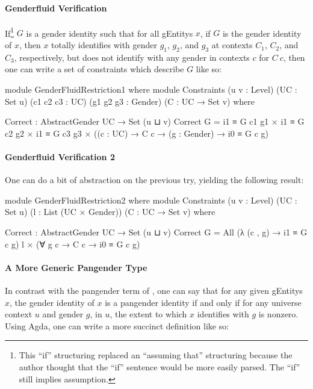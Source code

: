 \documentclass{article}
\theoremstyle{remark}
\begin{document}
\paragraph{Genderfluid Verification}
If\footnote{This ``if'' structuring replaced an ``assuming that'' structuring because the author thought that the ``if'' sentence would be more easily parsed.  The ``if'' still implies assumption.} \(G\) is a gender identity such that for all \glspl{gEntity} \(x\), if \(G\) is the gender identity of \(x\), then \(x\) totally identifies with gender \(g_1\), \(g_2\), and \(g_3\) at contexts \(C_1\), \(C_2\), and \(C_3\), respectively, but does not identify with any gender in contexts \(c\) for \(C\ c\), then one can write a set of constraints which describe \(G\) like so:

\begin{code}
    module GenderFluidRestriction1 where
      module Constraints
             (u v : Level)
             (UC : Set u)
             (c1 c2 c3 : UC)
             (g1 g2 g3 : Gender)
             (C : UC → Set v) where

        Correct : AbstractGender UC → Set (u ⊔ v)
        Correct G = i1 ≡ G c1 g1
                  × i1 ≡ G c2 g2
                  × i1 ≡ G c3 g3
                  × ((c : UC) → C c → (g : Gender) → i0 ≡ G c g)
\end{code}

\paragraph{Genderfluid Verification 2}
One can do a bit of abstraction on the previous try, yielding the following result:

\begin{code}
    module GenderFluidRestriction2 where
      module Constraints
             (u v : Level)
             (UC : Set u)
             (l : List (UC × Gender))
             (C : UC → Set v) where

        Correct : AbstractGender UC → Set (u ⊔ v)
        Correct G = All (λ (c , g) → i1 ≡ G c g) l
                  × (∀ g c → C c → i0 ≡ G c g)
\end{code}

\paragraph{A More Generic Pangender Type}
In contrast with the pangender term of , one can say that for any given \glspl{gEntity} \(x\), the gender identity of \(x\) is a pangender identity if and only if for any universe context \(u\) and gender \(g\), in \(u\), the extent to which \(x\) identifies with \(g\) is nonzero.  Using Agda, one can write a more succinct definition like so:
\end{document}
